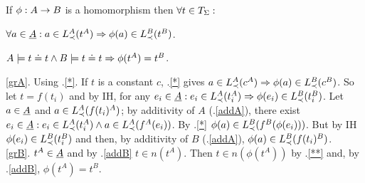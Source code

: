 \documentclass[12pt]{article}
\begin{document}
\begin{Prop}\label{cl:groundincl}
If $\phi:A\rightarrow B$ is a homomorphism then $\forall t\in T_{\Sigma}:$
\begin{enum}
\item\label{grA} $\forall a\in\underline {A}: a\in
L_{\prec}^A(t^A) \Rightarrow \phi(a)\in L_{\prec}^B(t^B)$.
\item\label{grB} $A\models t\mathrel{\dot{=} } t \land B\models t\mathrel{\dot{=} } t \Rightarrow \phi(t^A)=t^B$.
\end{enum}
\end{Prop}
\begin{Proof}
\ref{grA}. Using .\ref{*}. If $t$ is a constant $c$, .\ref{*} gives $a\in L_{\prec}^A(c^A) \Rightarrow
\phi(a)\in L_{\prec}^B(c^B)$. So let $t=f(t_i)$ and by IH, for any $e_i\in\underline {A}: e_i\in L_{\prec}^A(t_i^A) \Rightarrow \phi(e_i)\in L_{\prec}^B(t_i^B)$. Let $a\in\underline {A}$ and $a\in
L_{\prec}^A(f(t_i)^A)$; by additivity of $A$ (.\ref{addA}), there exist $e_i\in\underline {A}: e_i\in
L_{\prec}^A(t_i^A)\land a \in L_{\prec}^A(f^A(e_i))$. By .\ref{*} $\phi(a)\in
L_{\prec}^B(f^B(\phi(e_i)))$. But by IH $\phi(e_i)\in L_{\prec}^B(t_i^B)$ and then,
by additivity of $B$ (.\ref{addA}), $\phi(a)\in L_{\prec}^B(f(t_i)^B)$. \\[.5ex]
%
\ref{grB}. %
$t^A\in\underline {A}$ and by .\ref{addB} $t\in n(t^A)$. Then
   $t\in n(\phi(t^A))$ by .\ref{**} and, by .\ref{addB}, $\phi(t^A)=t^B$.
\end{Proof}
\end{document}
